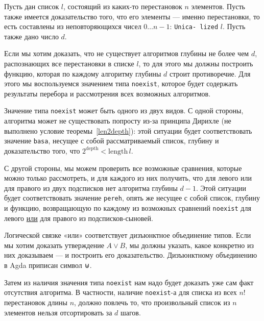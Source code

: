 

\abz Пусть дан список $l$, состоящий из каких-то перестановок $n$ элементов. Пусть также имеется доказательство того, что его элементы — именно перестановки, то есть составлены из неповторяющихся чисел $0 \ldots n-1$: {\tt Unica- \linebreak lized} $l$. Пусть также дано число $d$.

\abz Если мы хотим доказать, что не существует алгоритмов глубины не более чем $d$, распознающих все перестановки в списке $l$, то для этого мы должны построить функцию, которая по каждому алгоритму глубины $d$ строит противоречие. Для этого мы воспользуемся значением типа {\tt noexist}, которое будет содержать результаты перебора и рассмотрения всех возможных алгоритмов.

\abz Значение типа {\tt noexist} может быть одного из двух видов. С одной стороны, алгоритма может не существовать попросту из-за принципа Дирихле (не выполнено условие теоремы~\ref{len2depth}): этой ситуации будет соответствовать значение {\tt basa}, несущее с собой рассматриваемый список, глубину и доказательство того, что $2^\mathrm{depth} < \mathrm{length}\,l$.

\abz С другой стороны, мы можем проверить все возможные сравнения, которые можно только рассмотреть, и для каждого из них получить, что для левого или для правого из двух подсписков нет алгоритма глубины $d-1$. Этой ситуации будет соответствовать значение {\tt pereh}, опять же несущее с собой список, глубину и функцию, возвращающую по каждому из возможных сравнений {\tt noexist} для левого \underline{или} для правого из подсписков-сыновей.

\abz Логической связке «или» соответствует дизъюнктное объединение типов. Если мы хотим доказать утверждение $A \lor B$, мы должны указать, какое конкретно из них доказываем — и построить его доказательство. Дизъюнктному объединению в Agda приписан символ ⊎.

\abz Затем из наличия значения типа {\tt noexist} нам надо будет доказать уже сам факт отсутствия алгоритма. В частности, наличие {\tt noexist}-а для списка из всех $n!$ перестановок длины $n$, должно повлечь то, что произвольный список из $n$ элементов нельзя отсортировать за $d$ шагов.

